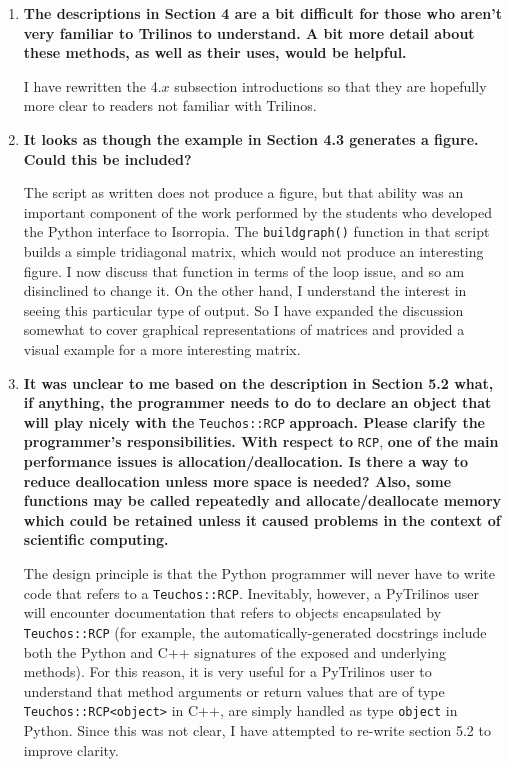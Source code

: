 \documentclass[11pt]{article}
\begin{document}
\begin{enumerate}
\item {\bf The descriptions in Section 4 are a bit difficult for those who aren't very familiar to Trilinos to understand. A bit more detail about these methods, as well as their uses, would be helpful.}

I have rewritten the 4.$x$ subsection introductions so that they are hopefully more clear to readers not familiar with Trilinos.

\item {\bf It looks as though the example in Section 4.3 generates a figure. Could this be included?}

The script as written does not produce a figure, but that ability was an important component of the work performed by the students who developed the Python interface to Isorropia.  The {\tt buildgraph()} function in that script  builds a simple tridiagonal matrix, which would not produce an interesting figure.  I now discuss that function in terms of the loop issue, and so am disinclined to change it.  On the other hand, I understand the interest in seeing this particular type of output.  So I have expanded the discussion somewhat to cover graphical representations of matrices and provided a visual example for a more interesting matrix.

\item {\bf It was unclear to me based on the description in Section 5.2 what, if anything, the programmer needs to do to declare an object that will play nicely with the} {\tt Teuchos::RCP} {\bf approach. Please clarify the programmer's responsibilities. With respect to} {\tt RCP}, {\bf one of the main performance issues is allocation/deallocation. Is there a way to reduce deallocation unless more space is needed? Also, some functions may be called repeatedly and allocate/deallocate memory which could be retained unless it caused problems in the context of scientific computing.}

The design principle is that the Python programmer will never have to write code that refers to a {\tt Teuchos::RCP}.  Inevitably, however, a PyTrilinos user will encounter documentation that refers to objects encapsulated by {\tt Teuchos::RCP} (for example, the automatically-generated docstrings include both the Python and C++ signatures of the exposed and underlying methods).  For this reason, it is very useful for a PyTrilinos user to understand that method arguments or return values that are of type {\tt Teuchos::RCP<object>} in C++, are simply handled as type {\tt object} in Python.  Since this was not clear, I have attempted to re-write section 5.2 to improve clarity.


\end{enumerate}
\end{document}
